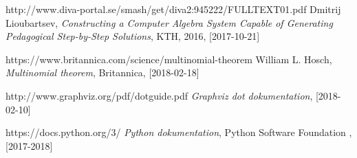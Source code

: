 \documentclass[12pt,a4paper]{article}
\begin{document}
\begin{thebibliography}{9}

  http://www.diva-portal.se/smash/get/diva2:945222/FULLTEXT01.pdf
  Dmitrij Lioubartsev,
  \textit{Constructing a Computer Algebra System Capable of Generating Pedagogical Step-by-Step Solutions},
  KTH,
  2016,
  [2017-10-21]

  https://www.britannica.com/science/multinomial-theorem
  William L. Hosch,
  \textit{Multinomial theorem},
  Britannica,
  [2018-02-18]

  http://www.graphviz.org/pdf/dotguide.pdf
  \textit{Graphviz dot dokumentation},
  [2018-02-10]

  https://docs.python.org/3/
  \textit{Python dokumentation},
  Python Software Foundation ,
  [2017-2018]
\end{thebibliography}
\newpage
\end{document}

